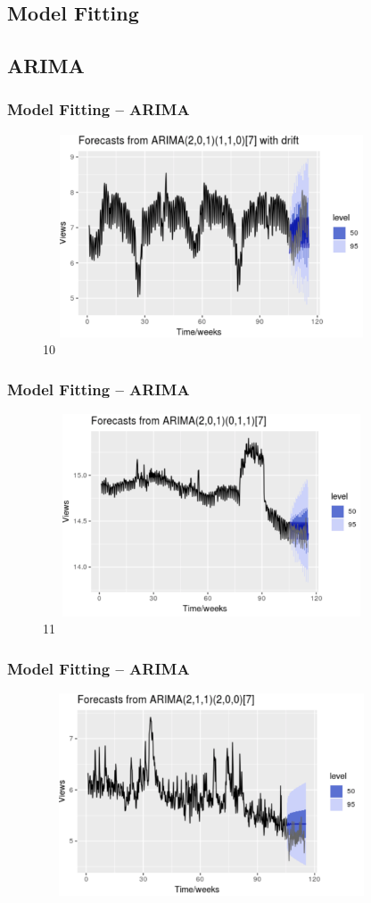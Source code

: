 \documentclass[cjk,10pt]{beamer}
\begin{document}
\begin{CJK*}{GBK}{song}
 \section{Model Fitting}
 \subsection{ARIMA}
    \begin{frame}
    \frametitle{Model Fitting -- ARIMA}
    \begin{figure}[htbp]
\centering
\includegraphics[height=6cm, width=10cm]{10}
\caption{10}
\end{figure}
       \end{frame}
     \begin{frame}
    \frametitle{Model Fitting -- ARIMA}
    \begin{figure}[htbp]
\centering
\includegraphics[height=6cm, width=10cm]{11}
\caption{11}
\end{figure}
       \end{frame}  
        \begin{frame}
    \frametitle{Model Fitting -- ARIMA}
    \begin{figure}[htbp]
\centering
\includegraphics[height=6cm, width=10cm]{12}

\end{figure}
\end{frame}
\end{CJK*}
\end{document}
